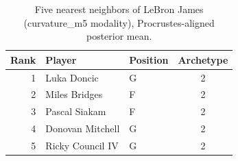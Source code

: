 \begin{table}[htbp]
  \centering\small
  \begin{tabular}{rllc}
    \toprule
    Rank & Player & Position & Archetype \\
    \midrule
    1 & Luka Doncic & G & 2 \\
    2 & Miles Bridges & F & 2 \\
    3 & Pascal Siakam & F & 2 \\
    4 & Donovan Mitchell & G & 2 \\
    5 & Ricky Council IV & G & 2 \\
    \bottomrule
  \end{tabular}
  \caption{Five nearest neighbors of LeBron James (curvature_m5 modality), Procrustes-aligned posterior mean.}
  \label{tab:LeBron_James_neighbors_curvature_m5}
\end{table}

